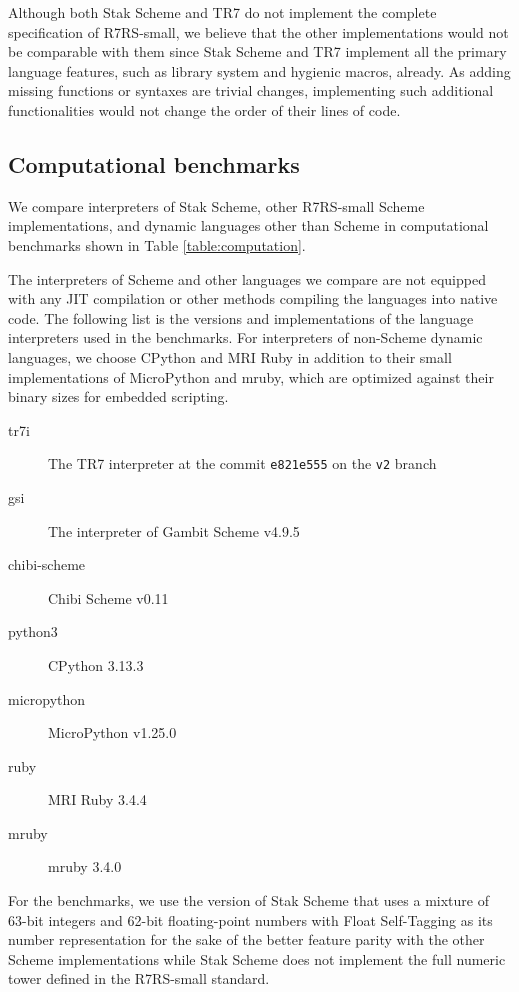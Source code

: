 \documentclass[sigplan, anonymous, review]{acmart}
\begin{document}
Although both Stak Scheme and TR7 do not implement the complete
specification of R7RS-small, we believe that the other
implementations would not be comparable with them since
Stak Scheme and TR7 implement all the primary language features,
such as library system and hygienic macros, already.
As adding missing functions or syntaxes are trivial changes,
implementing such additional functionalities would not change the
order of their lines of code.

\subsection{Computational benchmarks}

We compare interpreters of Stak Scheme, other R7RS-small Scheme
implementations, and
dynamic languages other than Scheme in computational
benchmarks shown in Table \ref{table:computation}.

The interpreters of Scheme and other languages we compare are not equipped with
any JIT compilation or other methods compiling the languages into
native code.
The following list is the versions and implementations of
the language interpreters used in the benchmarks.
For interpreters of non-Scheme dynamic languages, we choose CPython and
MRI Ruby in addition to their small implementations of MicroPython
and mruby, which are optimized against their binary sizes for
embedded scripting.

\begin{description}
  \item[tr7i] The TR7 interpreter at the commit \texttt{e821e555}
    on the \texttt{v2} branch
  \item[gsi] The interpreter of Gambit Scheme v4.9.5
  \item[chibi-scheme] Chibi Scheme v0.11
  \item[python3] CPython 3.13.3
  \item[micropython] MicroPython v1.25.0
  \item[ruby] MRI Ruby 3.4.4
  \item[mruby] mruby 3.4.0
\end{description}

For the benchmarks, we use the version of Stak Scheme that uses a
mixture of 63-bit integers and 62-bit floating-point numbers with Float
Self-Tagging \cite{floatselftag} as its number representation
for the sake of the better feature parity with
the other Scheme implementations while Stak Scheme does not implement
the full numeric tower defined in the R7RS-small standard.
\end{document}
